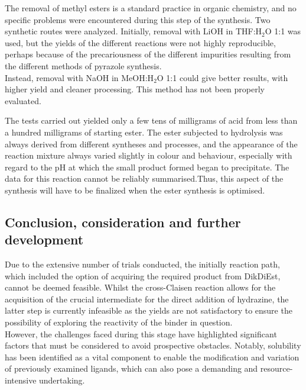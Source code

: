 \documentclass[../Master.tex]{subfiles}
\begin{document}
The removal of methyl esters is a standard practice in organic chemistry, and no specific problems were encountered during this step of the synthesis. Two synthetic routes were analyzed.
Initially, removal with LiOH in THF:H$_2$O 1:1 was used, but the yields of the different reactions were not highly reproducible, perhaps because of the precariousness of the different impurities resulting from the different methods of pyrazole synthesis. \\
Instead, removal with NaOH in MeOH:H$_{2}$O 1:1 could give better results, with higher yield and cleaner processing. This method has not been properly evaluated.

The tests carried out yielded only a few tens of milligrams of acid from less than a hundred milligrams of starting ester. The ester subjected to hydrolysis was always derived from different syntheses and processes, and the appearance of the reaction mixture always varied slightly in colour and behaviour, especially with regard to the pH at which the small product formed began to precipitate.
The data for this reaction cannot be reliably summarised.Thus, this aspect of the synthesis will have to be finalized when the ester synthesis is optimised.

\subsection{Conclusion, consideration and further development}\label{sec:conclusioni}

Due to the extensive number of trials conducted, the initially reaction path, which included the option of acquiring the required product from DikDiEst, cannot be deemed feasible. Whilst the cross-Claisen reaction allows for the acquisition of the crucial intermediate for the direct addition of hydrazine, the latter step is currently infeasible as the yields are not satisfactory to ensure the possibility of exploring the reactivity of the binder in question.\\
However, the challenges faced during this stage have highlighted significant factors that must be considered to avoid prospective obstacles. Notably, solubility has been identified as a vital component to enable the modification and variation of previously examined ligands, which can also pose a demanding and resource-intensive undertaking.
\end{document}
